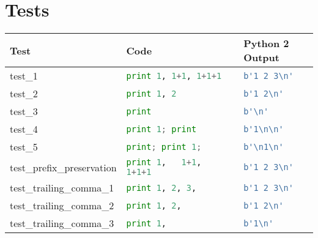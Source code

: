 \section{Tests}
\begin{table*}
    \centering
    \begin{tabular}{@{}l|ll@{}}
    \toprule
    Test                                  & Code                                                  & Python 2 Output                        \\ \midrule
    test\_1                               & \lstinline[language=Python, style=pythonstyle]|print 1, 1+1, 1+1+1                                  | & \lstinline[language=Python, style=pythonstyle]|b'1 2 3\n'             | \\
    test\_2                               & \lstinline[language=Python, style=pythonstyle]|print 1, 2                                           | & \lstinline[language=Python, style=pythonstyle]|b'1 2\n'               | \\
    test\_3                               & \lstinline[language=Python, style=pythonstyle]|print                                                | & \lstinline[language=Python, style=pythonstyle]|b'\n'                  | \\
    test\_4                               & \lstinline[language=Python, style=pythonstyle]|print 1; print                                       | & \lstinline[language=Python, style=pythonstyle]|b'1\n\n'| \\
    test\_5                               & \lstinline[language=Python, style=pythonstyle]|print; print 1;                                      | & \lstinline[language=Python, style=pythonstyle]|b'\n1\n'| \\
    test\_prefix\_preservation            & \lstinline[language=Python, style=pythonstyle]|print 1,   1+1,   1+1+1                              | & \lstinline[language=Python, style=pythonstyle]|b'1 2 3\n'             | \\
    test\_trailing\_comma\_1              & \lstinline[language=Python, style=pythonstyle]|print 1, 2, 3,                                       | & \lstinline[language=Python, style=pythonstyle]|b'1 2 3\n'             | \\
    test\_trailing\_comma\_2              & \lstinline[language=Python, style=pythonstyle]|print 1, 2,                                          | & \lstinline[language=Python, style=pythonstyle]|b'1 2\n'               | \\
    test\_trailing\_comma\_3              & \lstinline[language=Python, style=pythonstyle]|print 1,                                             | & \lstinline[language=Python, style=pythonstyle]|b'1\n'                 | \\

\end{tabular}
\end{table*}
